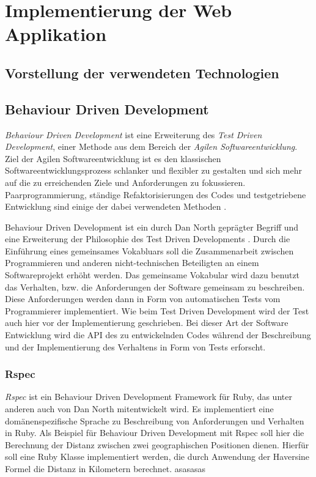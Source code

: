 \chapter{Implementierung der Web Applikation}
\section{Vorstellung der verwendeten Technologien}

\section{Behaviour Driven Development}

\textit{Behaviour Driven Development} ist eine Erweiterung des
\textit{Test Driven Development}, einer Methode aus dem Bereich der
\textit{Agilen Softwareentwicklung}. Ziel der Agilen
Softwareentwicklung ist es den klassischen Softwareentwicklungsprozess
schlanker und flexibler zu gestalten und sich mehr auf die zu
erreichenden Ziele und Anforderungen zu
fokussieren. Paarprogrammierung, ständige Refaktorisierungen des Codes
und testgetriebene Entwicklung sind einige der dabei verwendeten
Methoden \cite{wiki:agile}.

Behaviour Driven Development ist ein durch Dan North geprägter Begriff
und eine Erweiterung der Philosophie des Test Driven Developments
\cite{wiki:bdd}. Durch die Einführung eines gemeinsames Vokabluars
soll die Zusammenarbeit zwischen Programmieren und anderen
nicht-technischen Beteiligten an einem Softwareprojekt erhöht
werden. Das gemeinsame Vokabular wird dazu benutzt das Verhalten,
bzw. die Anforderungen der Software gemeinsam zu beschreiben. Diese
Anforderungen werden dann in Form von automatischen Tests vom
Programmierer implementiert. Wie beim Test Driven Development wird der
Test auch hier vor der Implementierung geschrieben. Bei dieser Art der
Software Entwicklung wird die API des zu entwickelnden Codes während
der Beschreibung und der Implementierung des Verhaltens in Form von
Tests erforscht.

\subsection{Rspec}

\textit{Rspec} ist ein Behaviour Driven Development Framework für
Ruby, das unter anderen auch von Dan North mitentwickelt wird. Es
implementiert eine domänenspezifische Sprache zu Beschreibung von
Anforderungen und Verhalten in Ruby. Als Beispiel für Behaviour Driven
Development mit Rspec soll hier die Berechnung der Distanz zwischen
zwei geographischen Positionen dienen. Hierfür soll eine Ruby Klasse
implementiert werden, die durch Anwendung der Haversine Formel
\cite{wiki:haversine} die Distanz in Kilometern berechnet. asasasas

